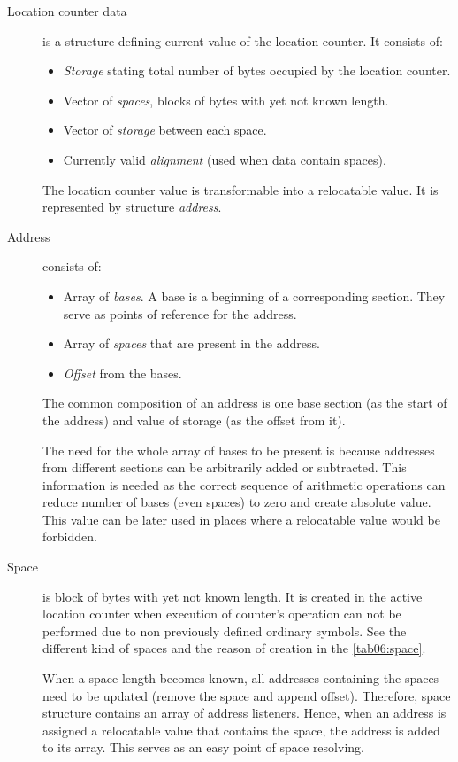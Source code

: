 \begin{description}
	\item[Location counter data] is a structure defining current value of the location counter. It consists of:
	\begin{itemize}
		\item \emph{Storage} stating total number of bytes occupied by the location counter.
		\item Vector of \emph{spaces}, blocks of bytes with yet not known length.
		\item Vector of \emph{storage} between each space.
		\item Currently valid \emph{alignment} (used when data contain spaces).
	\end{itemize}
	
	The location counter value is transformable into a relocatable value. It is represented by structure \emph{address}.
	
	\item[Address] consists of:
	\begin{itemize}
		\item Array of \emph{bases}. A base is a beginning of a corresponding section. They serve as points of reference for the address.
		\item Array of \emph{spaces} that are present in the address. 
		\item \emph{Offset} from the bases.
	\end{itemize}
	
	The common composition of an address is one base section (as the start of the address) and value of storage (as the offset from it).
	
	The need for the whole array of bases to be present is because addresses from different sections can be arbitrarily added or subtracted. This information is needed as the correct sequence of arithmetic operations can reduce number of bases (even spaces) to zero and create absolute value. This value can be later used in places where a relocatable value would be forbidden.
	
	\item[Space] is block of bytes with yet not known length. It is created in the active location counter when execution of counter's operation can not be performed due to non previously defined ordinary symbols. See the different kind of spaces and the reason of creation in  the \cref{tab06:space}.
	
	When a space length becomes known, all addresses containing the spaces need to be updated (remove the space and append offset). Therefore, space structure contains an array of address listeners. Hence, when an address is assigned a relocatable value that contains the space, the address is added to its array. This serves as an easy point of space resolving.
\end{description}



